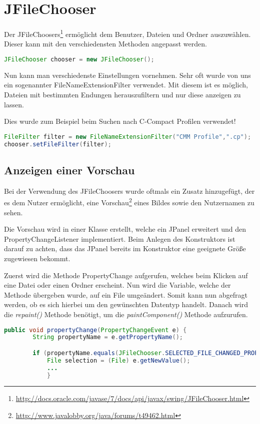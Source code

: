 \section{JFileChooser}
\label{sec:JFileChooser}

Der JFileChoosers\footnote{\url{http://docs.oracle.com/javase/7/docs/api/javax/swing/JFileChooser.html}} ermöglicht dem Benutzer, Dateien und Ordner auszuwählen. Dieser kann mit den verschiedensten Methoden angepasst werden.
\begin{lstlisting}[language=JAVA]
JFileChooser chooser = new JFileChooser();
\end{lstlisting}
    
Nun kann man verschiedenste Einstellungen vornehmen. Sehr oft wurde von uns ein sogenannter FileNameExtensionFilter verwendet. Mit diesem ist es möglich, Dateien mit bestimmten Endungen herauszufiltern und nur diese anzeigen zu lassen.

Dies wurde zum Beispiel beim Suchen nach C-Compact Profilen verwendet!
\begin{lstlisting}[language=JAVA]
FileFilter filter = new FileNameExtensionFilter("CMM Profile",".cp");
chooser.setFileFilter(filter);
\end{lstlisting}



\subsection{Anzeigen einer Vorschau}
Bei der Verwendung des JFileChoosers wurde oftmals ein Zusatz hinzugefügt, der es dem Nutzer ermöglicht, eine Vorschau\footnote{\url{http://www.javalobby.org/java/forums/t49462.html}} eines Bildes sowie den Nutzernamen zu sehen.

Die Vorschau wird in einer Klasse erstellt, welche ein JPanel erweitert und den PropertyChangeListener implementiert. Beim Anlegen des Konstruktors ist darauf zu achten, dass das JPanel bereits im Konstruktor eine geeignete Größe zugewiesen bekommt.

Zuerst wird die Methode PropertyChange aufgerufen, welches beim Klicken auf eine Datei oder einen Ordner erscheint. Nun wird die Variable, welche der Methode übergeben wurde, auf ein File umgeändert. Somit kann nun abgefragt werden, ob es sich hierbei um den gewünschten Datentyp handelt. Danach wird die \textit{repaint()} Methode benötigt, um die \textit{paintComponent()} Methode aufzurufen.
\begin{lstlisting}[language=JAVA]
	public void propertyChange(PropertyChangeEvent e) {
		String propertyName = e.getPropertyName();

		if (propertyName.equals(JFileChooser.SELECTED_FILE_CHANGED_PROPERTY)) {
			File selection = (File) e.getNewValue();
			...
			}
\end{lstlisting}

